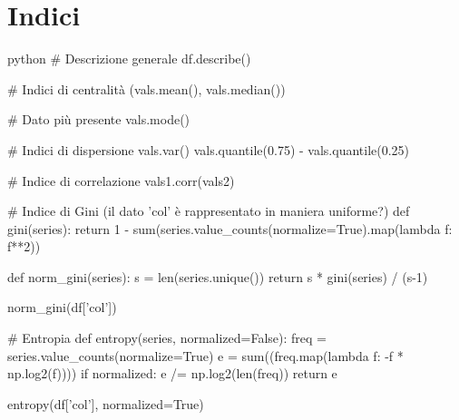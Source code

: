 \documentclass[11pt]{report}
\begin{document}
\section{Indici}
\begin{mintedbox}{python}
# Descrizione generale
df.describe()

# Indici di centralità
(vals.mean(), vals.median())

# Dato più presente
vals.mode()

# Indici di dispersione
vals.var()
vals.quantile(0.75) - vals.quantile(0.25)

# Indice di correlazione
vals1.corr(vals2)

# Indice di Gini (il dato 'col' è rappresentato in maniera uniforme?)
def gini(series):
    return 1 - sum(series.value_counts(normalize=True).map(lambda f: f**2))

def norm_gini(series):
    s = len(series.unique())
    return s * gini(series) / (s-1)

norm_gini(df['col'])

# Entropia
def entropy(series, normalized=False):
    freq = series.value_counts(normalize=True)
    e = sum((freq.map(lambda f: -f * np.log2(f))))
    if normalized:
        e /= np.log2(len(freq))
    return e

entropy(df['col'], normalized=True)
\end{mintedbox}
\end{document}

